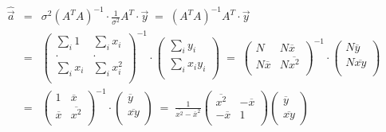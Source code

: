 %
%
%
\begin{slide}
\pagestyle{headings}
\sf
%
\begin{eqnarray*} 
 \hat{\vec{a}} 
 &  = &  \sigma^2 ( A^T A)^{-1} \cdot \frac{1}{\sigma^2} A^T\cdot \vec{y} 
\;  = \; (A^T A)^{-1} A^T \cdot \vec{y} 
\\
&  = & \left(
\begin{array}{ll}
\sum_{i} 1 & \sum_{i} x_i \\
. & . \\
\sum_{i} x_i & \sum_{i} x_i^2 \\
\end{array}
\right)^{-1} \cdot 
\left( 
\begin{array}{l}
\sum_{i} y_i \\
\sum_{i} x_i y_i \\
\end{array}
\right)
\; 
 =\;  \left(
\begin{array}{ll}
N & N \overline{x} \\
N \overline{x} & N \overline{x^2} \\
\end{array}
\right)^{-1} 
\cdot \left( 
\begin{array}{l} 
N\overline{y} \\
N\overline{xy} \\
\end{array}
\right) 
\\
&  =  & \left(
\begin{array}{ll}
1 & \overline{x} \\
\overline{x} & \overline{x^2} \\
\end{array}
\right)^{-1} \cdot 
\left( 
\begin{array}{l} 
\overline{y}\\
\overline{xy}\\
\end{array}
\right)
\; 
 = 
\; 
\frac{1}{\overline{x^2} - \overline{x}^2} 
\left(
\begin{array}{lr} 
\overline{x^2} & -\overline{x} \\
-\overline{x} & 1 \\
\end{array}
\right) 
\left( \begin{array}{l}
\overline{y}\\
\overline{xy} 
\end{array}
\right) 

\end{eqnarray*}
\end{slide}
